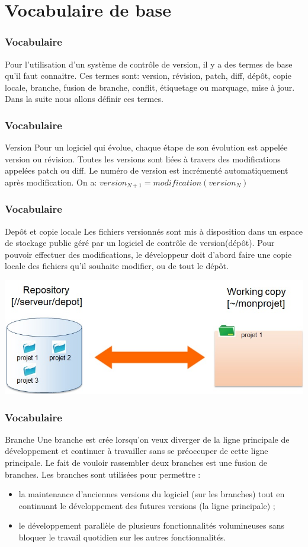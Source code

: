 \documentclass{beamer}
\begin{document}
\section{Vocabulaire de base}
\begin{frame}
\frametitle{Vocabulaire}
Pour l'utilisation d'un système de contrôle de version, il y a des termes de base qu'il faut connaitre. Ces termes sont: version, révision, patch, diff, dépôt, copie locale, branche, fusion de branche, conflit, étiquetage ou marquage, mise à jour. Dans la suite nous allons définir ces termes.
\end{frame}
\begin{frame}
\frametitle{Vocabulaire}
\begin{block}{Version}
Pour un logiciel qui évolue, chaque étape de son évolution est appelée \alert{version} ou \alert{révision}. Toutes les \alert{versions} sont liées à travers des modifications appelées \alert{patch} ou \alert{diff}. Le numéro de version est incrémenté automatiquement après modification. On a:
$ version_{N+1}=  modification(version_N) $
\end{block}

\end{frame}
\begin{frame}
\frametitle{Vocabulaire}
\begin{block}{Depôt et copie locale}
Les fichiers versionnés sont mis à disposition dans un espace de stockage public géré par un logiciel de contrôle de version(\alert{dépôt}). Pour pouvoir effectuer des modifications, le développeur doit d'abord faire une \alert{copie locale} des fichiers qu'il souhaite modifier, ou de tout le dépôt. 
\end{block}

\includegraphics[width=.7\textwidth]{../images/depot.jpg}
\end{frame}
\begin{frame}
\frametitle{Vocabulaire}
\begin{block}{Branche}
Une branche est crée lorsqu'on veux diverger de la ligne principale de développement et continuer à travailler sans se préoccuper de cette ligne principale. Le fait de vouloir rassembler deux branches est \alert{une fusion de branches}. Les branches sont utilisées pour permettre :
\begin{itemize}
\item la maintenance d'anciennes versions du logiciel (sur les branches) tout en continuant le développement des futures versions (la ligne principale) ;
\item le développement parallèle de plusieurs fonctionnalités volumineuses sans bloquer le travail quotidien sur les autres fonctionnalités.
\end{itemize}

\end{block}

\end{frame}
\end{document}

